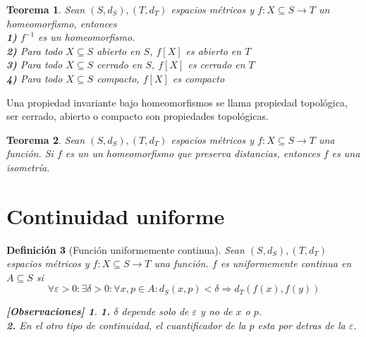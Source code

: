 \documentclass[oneside]{book} %
\theoremstyle{Teorema}
\newtheorem{Definicion}{Definición}[chapter]
\newtheorem{Teorema}[Definicion]{Teorema}
\theoremstyle{Ejemplos}
\theoremstyle{[Obs]}
\newtheorem*{Obs}{[Observaciones]}
\renewcommand{\{}{\left\lbrace} %
\renewcommand{\}}{\right\rbrace} %
\renewcommand{\sc}{\subseteq} %
\begin{document}
			\begin{Teorema}
				
				Sean $(S, d_S), (T, d_T)$ espacios métricos y $f : X \sc S \to T$ un homeomorfismo, entonces \\

				\textbf{1)} $f^{-1}$ es un homeomorfismo. \\

				\textbf{2)} Para todo $X \sc S$ abierto en $S$, $f[X]$ es abierto en $T$ \\

				\textbf{3)} Para todo $X \sc S$ cerrado en $S$, $f[X]$ es cerrado en $T$ \\

				\textbf{4)} Para todo $X \sc S$ compacto, $f[X]$ es compacto \\

			\end{Teorema}

			Una propiedad invariante bajo homeomorfismos se llama propiedad topológica, ser cerrado, abierto o compacto son propiedades topológicas. \\

			\begin{Teorema}
				
				Sean $(S, d_S), (T, d_T)$ espacios métricos y $f : X \sc S \to T$ una función. Si $f$ es un un homeomorfismo que preserva distancias, entonces $f$ es una isometría. \\

			\end{Teorema}

		\section{Continuidad uniforme}

			\begin{Definicion}[Función uniformemente continua]
				
				Sean $(S, d_S), (T, d_T)$ espacios métricos y $f : X \sc S \to T$ una función. $f$ es uniformemente continua en $A \sc S$ si \\

				\[ \forall \varepsilon > 0 : \exists \delta > 0 : \forall x, p \in A : d_S(x, p) < \delta \Rightarrow d_T(f(x), f(y)) \]

				\begin{Obs}
				
					\hfill
				
					\textbf{1.} $\delta$ depende solo de $\varepsilon$ y no de $x$ o $p$. \\
				
					\textbf{2.} En el otro tipo de continuidad, el cuantificador de la $p$ esta por detras de la $\varepsilon$. \\

				\end{Obs}

			\end{Definicion}
\end{document}
